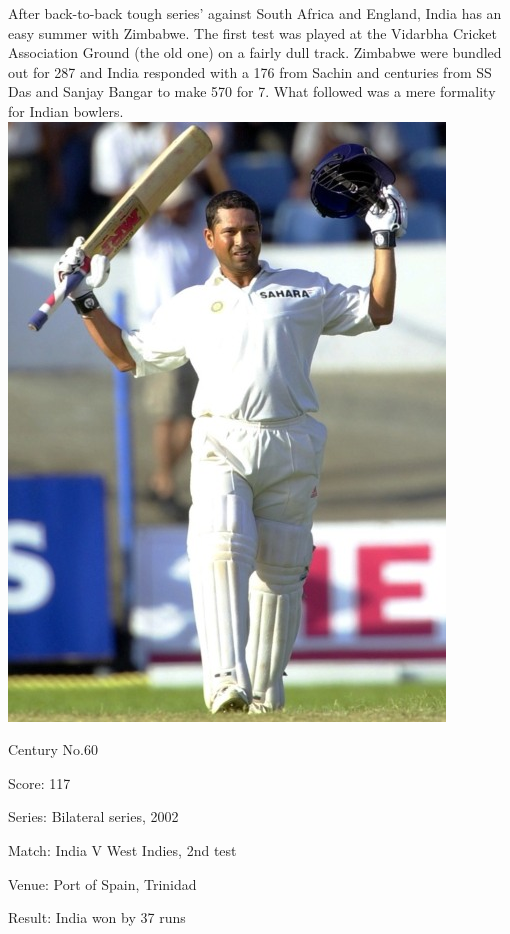 \documentclass[11pt, a4paper]{article}
\begin{document}
After back-to-back tough series' against South Africa and England, India has an easy summer with Zimbabwe. The first test was played at the Vidarbha Cricket Association Ground (the old one) on a fairly dull track. Zimbabwe were bundled out for 287 and India responded with a 176 from Sachin and centuries from SS Das and Sanjay Bangar to make 570 for 7. What followed was a mere formality for Indian bowlers.
\newpage
\includegraphics[height=0.7\textheight]{pics/60.jpg}

Century No.60 

Score: 117 

Series: Bilateral series, 2002 

Match: India V West Indies, 2nd test 

Venue: Port of Spain, Trinidad 

Result: India won by 37 runs 
\end{document}
